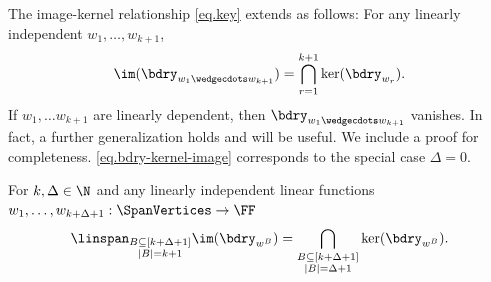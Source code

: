 \documentclass{toc}
\begin{document}
The image-kernel relationship \eqref{eq.key} extends as follows: For any linearly independent $w_1, \dots, w_{k+1}$,
\begin{equation}
  \label{eq.bdry-kernel-image}
\im(\bdry_{w_1 \wedgecdots w_{k+1}}) = 
\bigcap_{r=1}^{k+1} \ker(\bdry_{w_r}).
\end{equation}
If $w_1, \dots w_{k+1}$ are linearly dependent, then $\bdry_{w_1 \wedgecdots w_{k+1}}$ vanishes. In fact, a further generalization holds and will be useful. We include a proof for completeness. \eqref{eq.bdry-kernel-image} corresponds to the special case $\Delta=0$.
\begin{proposition}
    \label{prop.bdry-multiple-kernel-image}
    For $k, \Delta \in \N$ and any linearly independent linear functions $w_1,\dots,w_{k+\Delta+1}: \SpanVertices \to \FF$
    \begin{equation}\label{eq.bdry-kernel-image.general}
    \linspan_{\substack{B \subseteq [k+\Delta+1]\\ |B|=k+1}}\im(\bdry_{w^B}) = 
    \bigcap_{\substack{B \subseteq [k+\Delta+1] \\ |B|=\Delta+1}}
    \ker(\bdry_{w^B}). 
    \end{equation}
\end{proposition}
\end{document}
